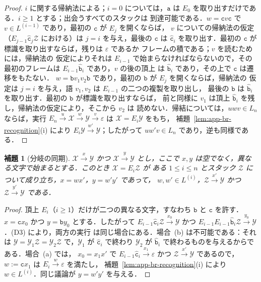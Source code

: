 \documentclass[11pt,a4paper]{ltjsarticle}
\numberwithin{equation}{section}
\theoremstyle{plain}
\newtheorem{lemma}[theorem]{補題}
\theoremstyle{definition}
\theoremstyle{remark}
\newcommand{\eps}{\varepsilon}
\theoremstyle{plain}
\begin{document}
\begin{proof}
$i$ に関する帰納法による；$i=0$ については，$\mathtt a$ は $E_0$ を取り出すだけである．$i\ge1$ とする；出会うすべてのスタックは
到達可能である．$w=\mathtt cv\mathtt c$ で $v\in L^{(i-1)}$ であり，最初の
$\mathtt c$ が $E_j$ を開くならば，
$v$ についての帰納法の仮定（$E_{j-1}\hat{\mathtt c}_j\mathcal Z$ における）は $j=i$ を与え，最後の $\mathtt c$ は
$\hat{\mathtt c}_i$ を取り出す．最初の $\mathtt c$ が標識を取り出すならば，残りは $\eps$ であるか
フレームの積である；$v$ を読むためには，帰納法の
仮定によりそれは $E_{i-1}$ で始まらなければならないので，その最初のフレームは $E_{i-1}\hat{\mathtt b}_i$ であり，$v$ の後の頂上
は $\hat{\mathtt b}_i$ であり，その上で $\mathtt c$ は遷移をもたない．
$w=\mathtt bv_1v_2\mathtt b$ であり，最初の $\mathtt b$ が $E_j$ を開くならば，帰納法の
仮定は $j=i$ を与え，語 $v_1,v_2$ は $E_{i-1}$ の二つの複製を取り出し，
最後の $\mathtt b$ は $\hat{\mathtt b}_i$ を取り出す．最初の $\mathtt b$ が標識を取り出すならば，
前と同様に $v_1$ は頂上 $\hat{\mathtt b}_i$ を残し，帰納法の仮定により，そこから $v_2$ は
読めない．帰結については，$uwv\in L_n$ ならば，実行
$E_n\xrightarrow{u}\mathcal X\xrightarrow{w}\mathcal Y\xrightarrow{v}\eps$ は
$\mathcal X=E_i\mathcal Y$ をもち，
補題~\ref{lem:app-br-recognition}(i) により $E_i\mathcal Y\xrightarrow{w'}\mathcal Y$；したがって $uw'v\in L_n$ であり，逆も同様である．
\end{proof}

\begin{lemma}[分岐の同期]\label{lem:app-br-branch}
$\mathcal X\xrightarrow{x}\mathcal Y$ かつ $\mathcal X\xrightarrow{y}\mathcal Y$ とし，ここで $x,y$
は空でなく，異なる文字で始まるとする．このとき $\mathcal X=E_i\mathcal Z$ が
ある $1\le i\le n$ とスタック $\mathcal Z$ について成り立ち，$x=wx'$，$y=w'y'$ であって，
$w,w'\in L^{(i)}$，$\mathcal Z\xrightarrow{x'}\mathcal Y$ かつ $\mathcal Z\xrightarrow{y'}\mathcal Y$ である．
\end{lemma}

\begin{proof}
頂上 $E_i$（$i\ge1$）だけが二つの異なる文字，すなわち $\mathtt b$ と
$\mathtt c$ を許す．$x=\mathtt cx_0$ かつ $y=\mathtt by_0$ とする．したがって
$E_{i-1}\hat{\mathtt c}_i\mathcal Z\xrightarrow{x_0}\mathcal Y$ かつ
$E_{i-1}E_{i-1}\hat{\mathtt b}_i\mathcal Z\xrightarrow{y_0}\mathcal Y$．(D3) により，両方の実行
は同じ場合にある．場合~(b) は不可能である：それは
$\mathcal Y=\mathcal Y_1\mathcal Z=\mathcal Y_2\mathcal Z$ で，$\mathcal Y_1$ が
$\hat{\mathtt c}_i$ で終わり $\mathcal Y_2$ が $\hat{\mathtt b}_i$ で終わるものを与えるからである．場合~(a) では，
$x_0=x_1x'$ で $E_{i-1}\hat{\mathtt c}_i\xrightarrow{x_1}\eps$ かつ
$\mathcal Z\xrightarrow{x'}\mathcal Y$ であるので，$w:=\mathtt cx_1$ は $E_i\xrightarrow{w}\eps$ を満たし，
補題~\ref{lem:app-br-recognition}(i) により $w\in L^{(i)}$．同じ議論が
$y=w'y'$ を与える．
\end{proof}
\end{document}
